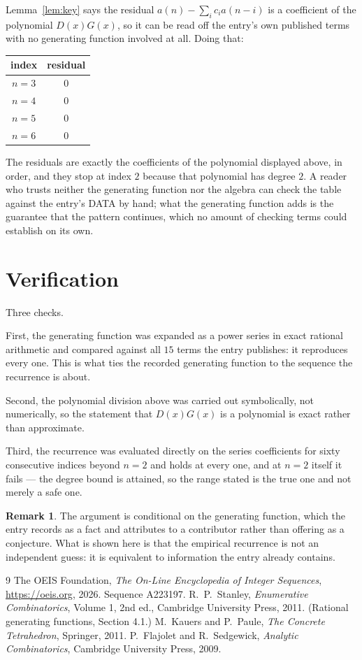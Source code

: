 \documentclass[11pt,a4paper]{article}
\theoremstyle{plain}
\theoremstyle{definition}
\newtheorem{remark}[theorem]{Remark}
\begin{document}
Lemma~\ref{lem:key} says the residual $a(n)-\sum_ic_ia(n-i)$ is a coefficient of the
polynomial $D(x)G(x)$, so it can be read off the entry's own published terms with no
generating function involved at all. Doing that:
\begin{center}
\begin{tabular}{cc}
index & residual \\ \hline
$n=3$ & $0$ \\
$n=4$ & $0$ \\
$n=5$ & $0$ \\
$n=6$ & $0$
\end{tabular}
\end{center}
The residuals are exactly the coefficients of the polynomial displayed above, in order, and
they stop at index $2$ because that polynomial has degree $2$. A reader who trusts
neither the generating function nor the algebra can check the table against the entry's DATA
by hand; what the generating function adds is the guarantee that the pattern continues, which
no amount of checking terms could establish on its own.

\section{Verification}

Three checks.

First, the generating function was expanded as a power series in exact rational arithmetic and
compared against all $15$ terms the entry publishes: it reproduces every one. This is
what ties the recorded generating function to the sequence the recurrence is about.

Second, the polynomial division above was carried out symbolically, not numerically, so the
statement that $D(x)G(x)$ is a polynomial is exact rather than approximate.

Third, the recurrence was evaluated directly on the series coefficients for sixty consecutive
indices beyond $n=2$ and holds at every one, and at $n=2$ itself it fails --- the
degree bound is attained, so the range stated is the true one and not merely a safe one.

\begin{remark}
The argument is conditional on the generating function, which the entry records as a fact and
attributes to a contributor rather than offering as a conjecture. What is shown here is that
the empirical recurrence is not an independent guess: it is equivalent to information the
entry already contains.
\end{remark}

\begin{thebibliography}{9}
 The OEIS Foundation, \emph{The On-Line Encyclopedia of Integer
Sequences}, \url{https://oeis.org}, 2026. Sequence A223197.
 R.~P.~Stanley, \emph{Enumerative Combinatorics}, Volume 1, 2nd ed.,
Cambridge University Press, 2011. (Rational generating functions, Section 4.1.)
 M.~Kauers and P.~Paule, \emph{The Concrete Tetrahedron}, Springer, 2011.
 P.~Flajolet and R.~Sedgewick, \emph{Analytic Combinatorics}, Cambridge
University Press, 2009.
\end{thebibliography}
\end{document}
